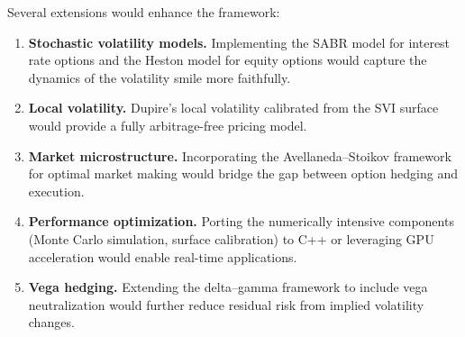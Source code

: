 \documentclass[11pt,a4paper]{article}
\begin{document}
Several extensions would enhance the framework:
\begin{enumerate}[nosep]
    \item \textbf{Stochastic volatility models.} Implementing the SABR model \citep{hagan2002managing} for interest rate options and the Heston model \citep{heston1993closed} for equity options would capture the dynamics of the volatility smile more faithfully.
    \item \textbf{Local volatility.} Dupire's local volatility \citep{dupire1994pricing} calibrated from the SVI surface would provide a fully arbitrage-free pricing model.
    \item \textbf{Market microstructure.} Incorporating the Avellaneda--Stoikov framework \citep{avellaneda2008high} for optimal market making would bridge the gap between option hedging and execution.
    \item \textbf{Performance optimization.} Porting the numerically intensive components (Monte Carlo simulation, surface calibration) to C++ or leveraging GPU acceleration would enable real-time applications.
    \item \textbf{Vega hedging.} Extending the delta--gamma framework to include vega neutralization would further reduce residual risk from implied volatility changes.
\end{enumerate}





\end{document}
